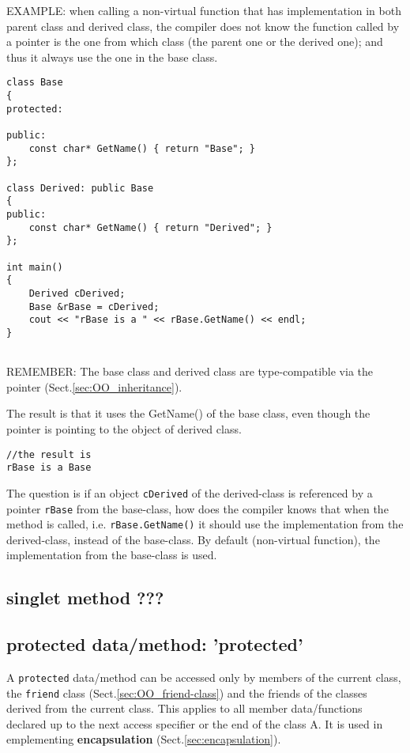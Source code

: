EXAMPLE: when calling a non-virtual function that has implementation in both
parent class and derived class, the compiler does not know the function called
by a pointer is the one from which class (the parent one or the derived one);
and thus it always use the one in the base class.

\begin{verbatim}
class Base
{
protected:
 
public:
    const char* GetName() { return "Base"; }
};
 
class Derived: public Base
{
public:
    const char* GetName() { return "Derived"; }
};

int main()
{
    Derived cDerived;
    Base &rBase = cDerived;
    cout << "rBase is a " << rBase.GetName() << endl;
}
 
\end{verbatim}
REMEMBER: The base class and derived class are type-compatible
via the pointer (Sect.\ref{sec:OO_inheritance}).

The result is that it uses the GetName() of the base class, even though the
pointer is pointing to the object of derived class.
\begin{verbatim}
//the result is
rBase is a Base
\end{verbatim}

\begin{mdframed}

The question is if an object \verb!cDerived! of the derived-class is referenced
by a pointer \verb!rBase! from the base-class, how does the compiler knows that
when the method is called, i.e. \verb!rBase.GetName()! it should use the
implementation from the derived-class, instead of the base-class.
By default (non-virtual function), the implementation from the base-class is
used. 

\end{mdframed}


\subsection{singlet method ???}


\subsection{protected data/method: 'protected'}
\label{sec:OO_protected-data_method}

A \verb!protected! data/method can be accessed only by members of the current
class, the \verb!friend! class (Sect.\ref{sec:OO_friend-class}) and the friends
of the classes derived from the current class. This applies to all member
data/functions declared up to the next access specifier or the end of the class
A. It is used in emplementing {\bf encapsulation}
(Sect.\ref{sec:encapsulation}).

